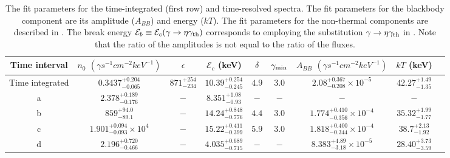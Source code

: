 \begin{table}
\scriptsize
\centering
\begin{tabular}{c | c c c c c c c c}
Time interval&$n_{0}$ {$(\gamma s^{-1}cm^{-2}keV^{-1})$} & $\epsilon$ & $\mathcal{E}_c$ (keV) & $\delta$ & $\gamma_{\rm min}$ & $A_{BB}$ $(\gamma s^{-1}cm^{-2}keV^{-1})$ & $kT$ (keV) \\
\hline \hline
Time integrated&$0.3437_{-0.065}^{+0.204}$ & $871_{-234}^{+254}$ & $10.39_{-0.245}^{+0.254}$ & $4.9$ & $3.0$ & $2.08_{-0.208}^{+0.367}\times10^{-5}$ & $42.27_{-1.35}^{+1.49}$ \\

a&$ 2.378_{-0.176}^{+0.189}$ & $-$ &   $8.351_{-0.93}^{+1.08}$ & $-$ & $-$ & $-$ & $-$ \\

b&$ 859_{-89.1}^{+94.0}$ & $-$ & $14.24_{-0.776}^{+0.848} $ & $ 4.4 $ & $3.0$ & $1.774_{-0.356}^{+0.410}\times10^{-4}$ & $35.32_{-1.77}^{+1.99}$ \\

c& $1.901_{-0.093}^{+0.094}\times10^{4}$ & $-$ & $15.22_{-0.399}^{+0.411}$ & $ 5.9$ & $3.0$ & $1.818_{-0.344}^{+0.400}\times10^{-4}$ & $ 38.7_{-1.92}^{+2.13}$ \\

d&$ 2.196_{-0.466}^{+0.720}$ & $-$ & $4.035_{-0.715}^{+0.689}$ & $-$ & $-$ & $8.383_{-3.18}^{+4.89}\times10^{-5}$ & $ 28.40_{-3.59}^{+3.73}$ \\

\end{tabular}

\caption{The fit parameters for the
  time-integrated (first row) and time-resolved spectra. The fit
  parameters for the blackbody component are its amplitude
  ($A_{BB}$) and energy ($kT$). The fit parameters for the
  non-thermal components are described in
  . The break energy
  $\mathcal{E}_b\equiv \mathcal{E}_c(\gamma \to \eta\gamma_{\rm th} )$
  corresponds to employing the substitution $\gamma \to \eta\gamma_{\rm th}
  $ in .  Note that the ratio of the
  amplitudes is not equal to the ratio of the fluxes.}

\label{tab:table1}
\end{table}




